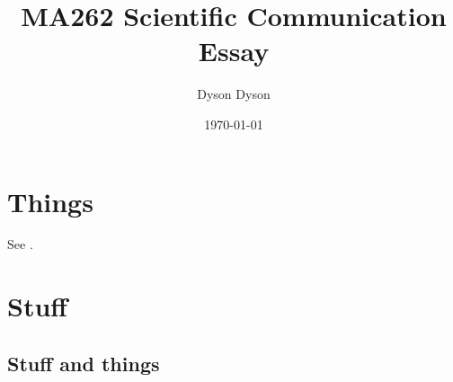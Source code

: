 \documentclass[a4paper]{article}
\title{MA262 Scientific Communication Essay}
\author{Dyson Dyson}
\date{\today}
\begin{document}
\maketitle

\setlength{\parindent}{0em}
\setlength{\parskip}{1em}

\tableofcontents
\newpage

\section{Things}

See \citep{knuth-1989-mathematical-writing}.

\section{Stuff}

\subsection{Stuff and things}

\newpage
\printbibliography[]
\end{document}

